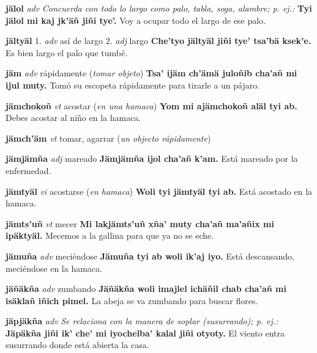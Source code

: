 \documentclass[10pt]{scrbook}
\newcommand{\entry}[1]{\textbf{#1}}
\newcommand{\onedefinition}[1]{#1.}
\newcommand{\nontranslationdef}[1]{\textit{#1}}
\newcommand{\partofspeech}[1]{\textit{#1}}
\newcommand{\spanishtranslation}[1]{#1}
\newcommand{\clarification}[1]{(\textit{#1})}
\newcommand{\cholexample}[1]{\textbf{#1}}
\newcommand{\exampletranslation}[1]{#1}
\begin{document}
\begin{multicols}{2}
\entry{jälol}
\partofspeech{adv}
\nontranslationdef{Concuerda con todo lo largo como palo, tabla, soga, alambre; p. ej.:}
\cholexample{Tyi jälol mi kaj jk'äñ jiñi tye'.}
\exampletranslation{Voy a ocupar todo el largo de ese palo.}

\entry{jältyäl}
\onedefinition{1}
\partofspeech{adv}
\spanishtranslation{así de largo}
\onedefinition{2}
\partofspeech{adj}
\spanishtranslation{largo}
\cholexample{Che'tyo jältyäl jiñi tye' tsa'bä ksek'e.}
\exampletranslation{Es bien largo el palo que tumbé.}

\entry{jäm}
\partofspeech{adv}
\spanishtranslation{rápidamente}
\clarification{tomar objeto}
\cholexample{Tsa' ijäm ch'ämä juloñib cha'añ mi ijul muty.}
\exampletranslation{Tomó su escopeta rápidamente para tirarle a un pájaro.}

\entry{jämchokoñ}
\partofspeech{vt}
\spanishtranslation{acostar}
\clarification{en una hamaca}
\cholexample{Yom mi ajämchokoñ aläl tyi ab.}
\exampletranslation{Debes acostar al niño en la hamaca.}

\entry{jämch'äm}
\partofspeech{vt}
\spanishtranslation{tomar, agarrar}
\clarification{un objecto rápidamente}

\entry{jämjämña}
\partofspeech{adj}
\spanishtranslation{mareado}
\cholexample{Jämjämña ijol cha'añ k'am.}
\exampletranslation{Está mareado por la enfermedad.}

\entry{jämtyäl}
\partofspeech{vi}
\spanishtranslation{acostarse}
\clarification{en hamaca}
\cholexample{Woli tyi jämtyäl tyi ab.}
\exampletranslation{Está acostado en la hamaca.}

\entry{jämts'uñ}
\partofspeech{vt}
\spanishtranslation{mecer}
\cholexample{Mi lakjämts'uñ xña' muty cha'añ ma'añix mi ipäktyäl.}
\exampletranslation{Mecemos a la gallina para que ya no se eche.}

\entry{jämuña}
\partofspeech{adv}
\spanishtranslation{meciéndose}
\cholexample{Jämuña tyi ab woli ik'aj iyo.}
\exampletranslation{Está descansando, meciéndose en la hamaca.}

\entry{jäñäkña}
\partofspeech{adv}
\spanishtranslation{zumbando}
\cholexample{Jäñäkña woli imajlel ichäñil chab cha'añ mi isäklañ iñich pimel.}
\exampletranslation{La abeja se va zumbando para buscar flores.}

\entry{jäpjäkña}
\partofspeech{adv}
\nontranslationdef{Se relaciona con la manera de soplar (susurrando); p. ej.:}
\cholexample{Jäpäkña jiñi ik' che' mi iyochelba' kalal jiñi otyoty.}
\exampletranslation{El viento entra susurrando donde está abierta la casa.}


\end{multicols}
\end{document}
